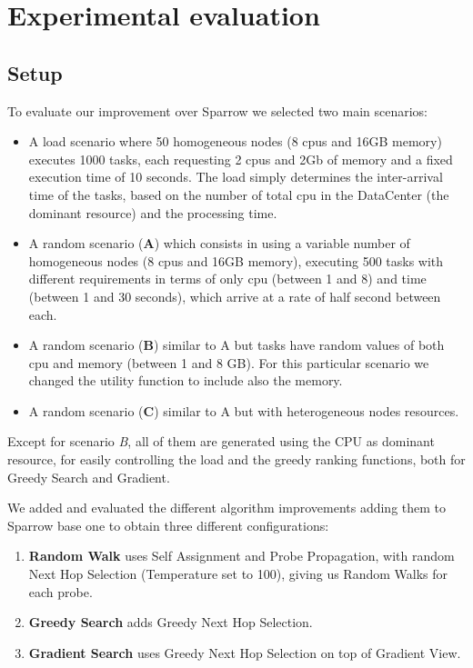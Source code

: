\documentclass[conference]{IEEEtran}
\begin{document}
\section{Experimental evaluation}

\subsection{Setup}
To evaluate our improvement over Sparrow we selected two main scenarios:
\begin{itemize}

\item A load scenario where 50 homogeneous nodes (8 cpus and 16GB memory) executes 1000 tasks, each requesting 2 cpus and 2Gb of memory and a fixed execution time of 10 seconds. The load simply determines the inter-arrival time of the tasks, based on the number of total cpu in the DataCenter (the dominant resource) and the processing time.

\item A random scenario (\textbf{A}) which consists in using  a variable number of homogeneous nodes (8 cpus and 16GB memory), executing 500 tasks with different requirements in terms of only cpu (between 1 and 8) and time (between 1 and 30 seconds), which arrive at a rate of half second between each.

\item A random scenario (\textbf{B}) similar to A but tasks have random values of both cpu and memory (between 1 and 8 GB). For this particular scenario we changed the utility function to include also the memory.

\item A random scenario (\textbf{C}) similar to A but with heterogeneous nodes resources.

\end{itemize}

Except for scenario \textit{B}, all of them are generated using the CPU as dominant resource, for easily controlling the load and the greedy ranking functions, both for Greedy Search and Gradient.

We added and evaluated the different algorithm improvements adding them to Sparrow base one to obtain three different configurations: 
\begin{enumerate}
\item \textbf{Random Walk} uses Self Assignment and Probe Propagation, with random Next Hop Selection (Temperature set to 100), giving us Random Walks for each probe. 
\item \textbf{Greedy Search} adds Greedy Next Hop Selection.
\item \textbf{Gradient Search} uses Greedy Next Hop Selection on top of Gradient View.
\end{enumerate}
\end{document}
